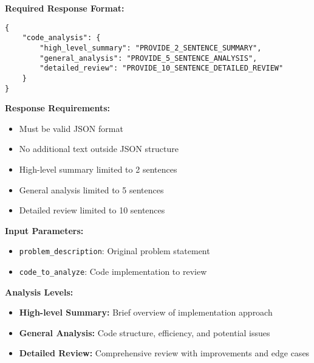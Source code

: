 {\begin{tcolorbox}[
    colback=white,
    colframe=blue!75!black,
    title=Code Review Feedback Prompt,
    fonttitle=\bfseries
]
\textbf{Required Response Format:}

\begin{lstlisting}[style=jsonStyle]
{
    "code_analysis": {
        "high_level_summary": "PROVIDE_2_SENTENCE_SUMMARY",
        "general_analysis": "PROVIDE_5_SENTENCE_ANALYSIS",
        "detailed_review": "PROVIDE_10_SENTENCE_DETAILED_REVIEW"
    }
}
\end{lstlisting}

\textbf{Response Requirements:}
\begin{itemize}
    \item Must be valid JSON format
    \item No additional text outside JSON structure
    \item High-level summary limited to 2 sentences
    \item General analysis limited to 5 sentences
    \item Detailed review limited to 10 sentences
\end{itemize}

\textbf{Input Parameters:}
\begin{itemize}
    \item \texttt{problem\_description}: Original problem statement
    \item \texttt{code\_to\_analyze}: Code implementation to review
\end{itemize}

\textbf{Analysis Levels:}
\begin{itemize}
    \item \textbf{High-level Summary:} Brief overview of implementation approach
    \item \textbf{General Analysis:} Code structure, efficiency, and potential issues
    \item \textbf{Detailed Review:} Comprehensive review with improvements and edge cases
\end{itemize}
\end{tcolorbox}

}



